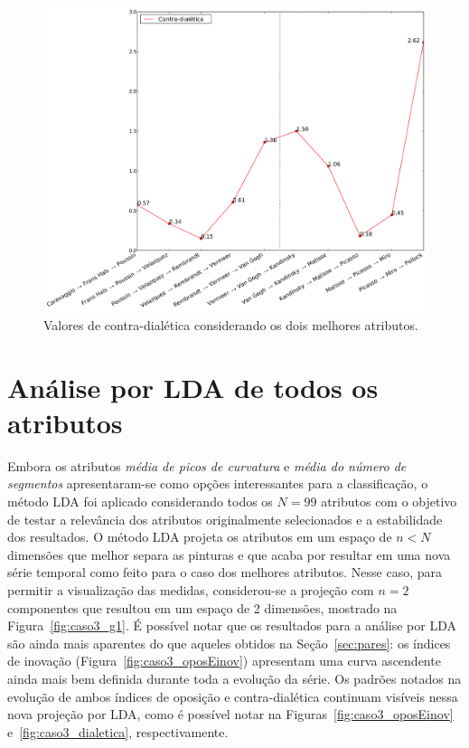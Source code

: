 \begin{figure}[h!]
\begin{center}
        \includegraphics[width=\columnwidth]{figs/caso1_dialetica}
    \caption{Valores de contra-dialética considerando os dois melhores atributos.}
        \label{fig:caso1_dialetica}
\end{center}
\end{figure}

\section{Análise por LDA de todos os atributos}
\label{subsec:lda}

Embora os atributos \emph{média de picos de curvatura} e \emph{média
  do número de segmentos} apresentaram-se como opções interessantes
para a classificação, o método LDA foi aplicado considerando todos os
$N = 99$ atributos com o objetivo de testar a relevância dos atributos
originalmente selecionados e a estabilidade dos resultados. O método
LDA projeta os atributos em um espaço de $n < N$ dimensões que melhor
separa as pinturas e que acaba por resultar em uma nova série temporal
como feito para o caso dos melhores atributos. Nesse caso, para
permitir a visualização das medidas, considerou-se a projeção com $n =
2$ componentes que resultou em um espaço de 2 dimensões, mostrado na
Figura~\ref{fig:caso3_g1}. É possível notar que os resultados para a
análise por LDA são ainda mais aparentes do que aqueles obtidos na
Seção~\ref{sec:pares}: os índices de inovação
(Figura~\ref{fig:caso3_oposEinov}) apresentam uma curva ascendente
ainda mais bem definida durante toda a evolução da série. Os padrões
notados na evolução de ambos índices de oposição e contra-dialética
continuam visíveis nessa nova projeção por LDA, como é possível notar
na Figuras~\ref{fig:caso3_oposEinov} e~\ref{fig:caso3_dialetica},
respectivamente.

